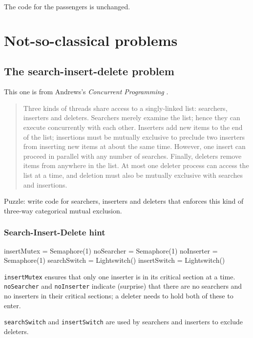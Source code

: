 \documentclass{book}
\begin{document}
The code for the passengers is unchanged.



\chapter{Not-so-classical problems}

\section{The search-insert-delete problem}

This one is from Andrews's {\em Concurrent Programming} \cite{andrews}.

\begin {quotation}
Three kinds of threads share access to a singly-linked list:
searchers, inserters and deleters.  Searchers merely examine the list;
hence they can execute concurrently with each other.  Inserters add
new items to the end of the list; insertions must be mutually
exclusive to preclude two inserters from inserting new items at about
the same time.  However, one insert can proceed in parallel with any
number of searches.  Finally, deleters remove items from anywhere in
the list.  At most one deleter process can access the list at a time,
and deletion must also be mutually exclusive with searches and
insertions.
\end{quotation}

Puzzle: write code for searchers, inserters and deleters that
enforces this kind of three-way categorical mutual exclusion.



\subsection{Search-Insert-Delete hint}

\begin{unbreakable}[title={Search-Insert-Delete hint}]{}
insertMutex = Semaphore(1)
noSearcher = Semaphore(1)
noInserter = Semaphore(1)
searchSwitch = Lightswitch()
insertSwitch = Lightswitch()
\end{unbreakable}

{\tt insertMutex} ensures that only one inserter is in its critical
section at a time.  {\tt noSearcher} and {\tt noInserter} indicate
(surprise) that there are no searchers and no inserters in their
critical sections; a deleter needs to hold both of these to enter.

    {\tt searchSwitch} and {\tt insertSwitch} are used by searchers and
inserters to exclude deleters.
\end{document}

